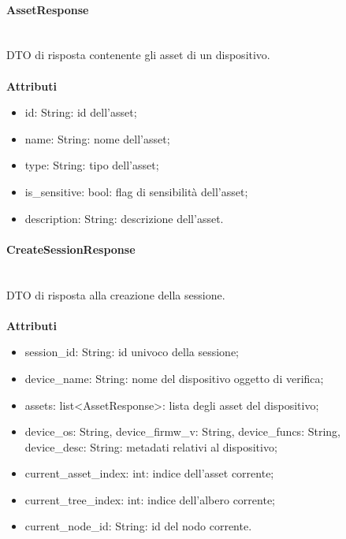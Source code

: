 \documentclass[a4paper,12pt]{article}
\begin{document}
                \paragraph{AssetResponse}\mbox{}\\
                    DTO di risposta contenente gli asset di un dispositivo.\\\\
                    \textbf{Attributi}
                    \begin{itemize}
                        \item {\ttfamily id: String}: id dell'asset;
                        \item {\ttfamily name: String}: nome dell'asset;
                        \item {\ttfamily type: String}: tipo dell'asset;
                        \item {\ttfamily is\_sensitive: bool}: flag di sensibilità dell'asset;
                        \item {\ttfamily description: String}: descrizione dell'asset.
                    \end{itemize}

                \paragraph{CreateSessionResponse}\mbox{}\\
                    DTO di risposta alla creazione della sessione.\\\\
                    \textbf{Attributi}
                    \begin{itemize}
                        \item {\ttfamily session\_id: String}: id univoco della sessione;
                        \item {\ttfamily device\_name: String}: nome del dispositivo oggetto di verifica;
                        \item {\ttfamily assets: list<AssetResponse>}: lista degli asset del dispositivo;
                        \item {\ttfamily device\_os: String}, {\ttfamily device\_firmw\_v: String}, {\ttfamily device\_funcs: String}, {\ttfamily device\_desc: String}: metadati relativi al dispositivo;
                        \item {\ttfamily current\_asset\_index: int}: indice dell'asset corrente;
                        \item {\ttfamily current\_tree\_index: int}: indice dell'albero corrente;
                        \item {\ttfamily current\_node\_id: String}: id del nodo corrente.
                    \end{itemize}
\end{document}
